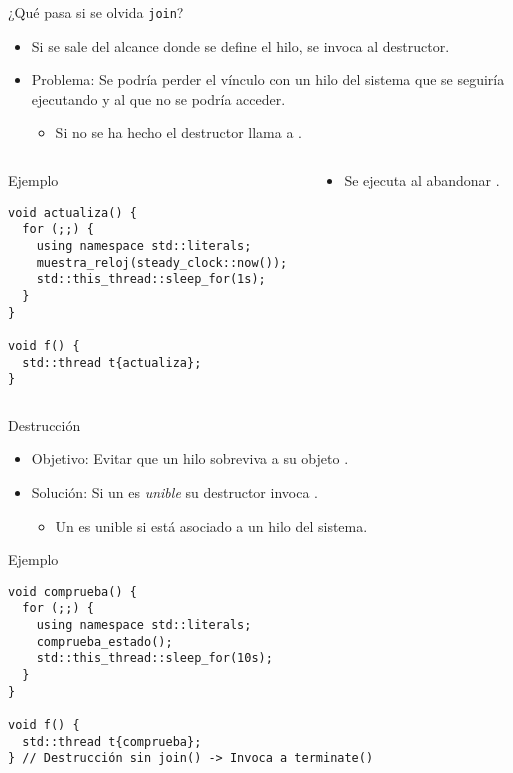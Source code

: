 \begin{frame}[fragile]{¿Qué pasa si se olvida \texttt{join}?}
\begin{itemize}
  \item Si se sale del alcance donde se define el hilo, se invoca al destructor.
  \item \alert{Problema}: Se podría perder el vínculo con un hilo del sistema que se seguiría
        ejecutando y al que no se podría acceder.
    \begin{itemize}
      \item Si no se ha hecho  el destructor llama a .
    \end{itemize}
\end{itemize}

\begin{columns}

\begin{column}{.5\textwidth}
\begin{block}{Ejemplo}
\begin{lstlisting}[basicstyle=\tiny]
void actualiza() {
  for (;;) {
    using namespace std::literals;
    muestra_reloj(steady_clock::now());
    std::this_thread::sleep_for(1s);
  }
}

void f() {
  std::thread t{actualiza};
}
\end{lstlisting}
\end{block}
\end{column}

\begin{column}{.5\textwidth}
\begin{itemize}
  \item Se ejecuta  al abandonar .
\end{itemize}
\end{column}
\end{columns}
\end{frame}

\begin{frame}[fragile]{Destrucción}
\begin{itemize}
  \item Objetivo: Evitar que un hilo sobreviva a su objeto .
  \item Solución: Si un  es \emph{unible} su destructor invoca .
    \begin{itemize}
      \item Un  es unible si está asociado a un hilo del sistema.
    \end{itemize}
\end{itemize}
\begin{block}{Ejemplo}
\begin{lstlisting}
void comprueba() {
  for (;;) {
    using namespace std::literals;
    comprueba_estado();
    std::this_thread::sleep_for(10s);
  }
}

void f() {
  std::thread t{comprueba};
} // Destrucción sin join() -> Invoca a terminate()
\end{lstlisting}
\end{block}
\end{frame}

